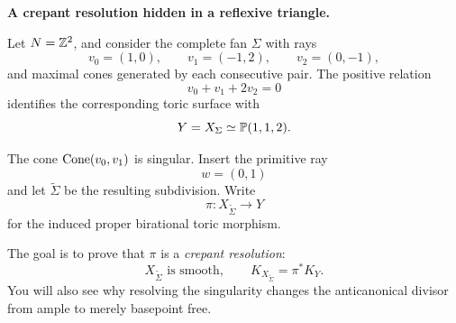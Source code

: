 \noindent
\textbf{A crepant resolution hidden in a reflexive triangle.}

\medskip

Let \(N=\mathbb{Z}^2\), and consider the complete fan \(\Sigma\) with rays
\[
v_0=(1,0),
\qquad
v_1=(-1,2),
\qquad
v_2=(0,-1),
\]
and maximal cones generated by each consecutive pair. The positive
relation
\[
v_0+v_1+2v_2=0
\]
identifies the corresponding toric surface with
\[
Y=X_\Sigma\simeq\mathbb{P}(1,1,2).
\]

The cone \(\operatorname{Cone}(v_0,v_1)\) is singular. Insert the primitive ray
\[
w=(0,1)
\]
and let \(\widetilde\Sigma\) be the resulting subdivision. Write
\[
\pi:X_{\widetilde\Sigma}\longrightarrow Y
\]
for the induced proper birational toric morphism.

The goal is to prove that \(\pi\) is a \emph{crepant resolution}:
\[
X_{\widetilde\Sigma}\text{ is smooth},
\qquad
K_{X_{\widetilde\Sigma}}=\pi^*K_Y.
\]
You will also see why resolving the singularity changes the
anticanonical divisor from ample to merely basepoint free.

